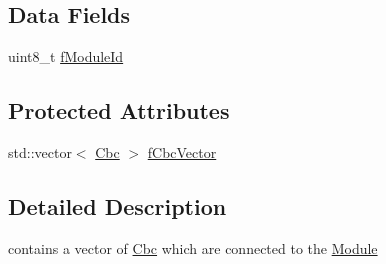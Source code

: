\subsection*{Data Fields}
\begin{DoxyCompactItemize}
\item 
uint8\-\_\-t \hyperlink{class_ph2___hw_description_1_1_module_a8bf42ae708d304acbc5509edf7f7cee0}{f\-Module\-Id}
\end{DoxyCompactItemize}
\subsection*{Protected Attributes}
\begin{DoxyCompactItemize}
\item 
std\-::vector$<$ \hyperlink{class_ph2___hw_description_1_1_cbc}{Cbc} $>$ \hyperlink{class_ph2___hw_description_1_1_module_ab5cfd93bf927592f609d31f66cd4161b}{f\-Cbc\-Vector}
\end{DoxyCompactItemize}


\subsection{Detailed Description}
contains a vector of \hyperlink{class_ph2___hw_description_1_1_cbc}{Cbc} which are connected to the \hyperlink{class_ph2___hw_description_1_1_module}{Module} 

